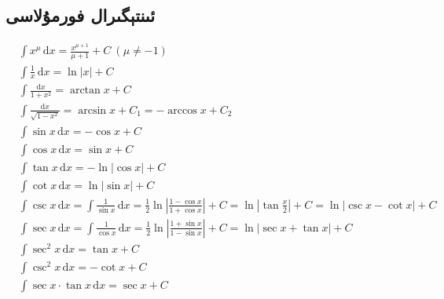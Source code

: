 \subsection{ئىنتېگىرال فورمۇلاسى}
\begin{align*}
     & \int x^\mu\,\mathrm{d}x=\frac{x^{\mu+1}}{\mu+1}+C\ (\mu\neq-1)                                                         \\[7pt]
     & \int \frac{1}{x}\,\mathrm{d}x=\ln|x|+C                                                                                 \\[7pt]
     & \int\frac{\mathrm{d}x}{1+x^2}=\arctan x+C                                                                              \\[7pt]
     & \int\frac{\mathrm{d}x}{\sqrt{1-x^2}}=\arcsin x+C_1=-\arccos x+C_2                                                      \\[7pt]
     & \int \sin x\,\mathrm{d}x=-\cos x+C                                                                                     \\[7pt]
     & \int\cos x \,\mathrm{d}x=\sin x +C                                                                                     \\[7pt]
     & \int\tan x\,\mathrm{d}x=-\ln |\cos x|+C                                                                                \\[7pt]
     & \int\cot x\,\mathrm{d}x=\ln |\sin x|+C                                                                                 \\[7pt]
     & \int\csc x\,\mathrm{d}x=\int\frac{1}{\sin{x}}\,\mathrm{d}x=\frac{1}{2}
    \ln{\left|\frac{1-\cos{x}}{1+\cos{x}}\right|}+C=\ln{\left|\tan{\frac{x}{2}}\right|}+C=\ln{\left|\csc{x}-\cot{x}\right|}+C \\[7pt]
     & \int\sec x\,\mathrm{d}x=\int\frac{1}{\cos{x}}\,\mathrm{d}x=\frac{1}{2}
    \ln{\left|\frac{1+\sin{x}}{1-\sin{x}}\right|}+C=\ln{\left|\sec{x}+\tan{x}\right|}+C                                       \\[7pt]
     & \int\sec^2 x\,\mathrm{d}x=\tan x +C                                                                                    \\[7pt]
     & \int \csc^2 x\,\mathrm{d}x=-\cot x +C                                                                                  \\[7pt]
     & \int \sec x\cdot\tan x \,\mathrm{d}x=\sec x+C                                                                          \\[7pt]

\end{align*}
